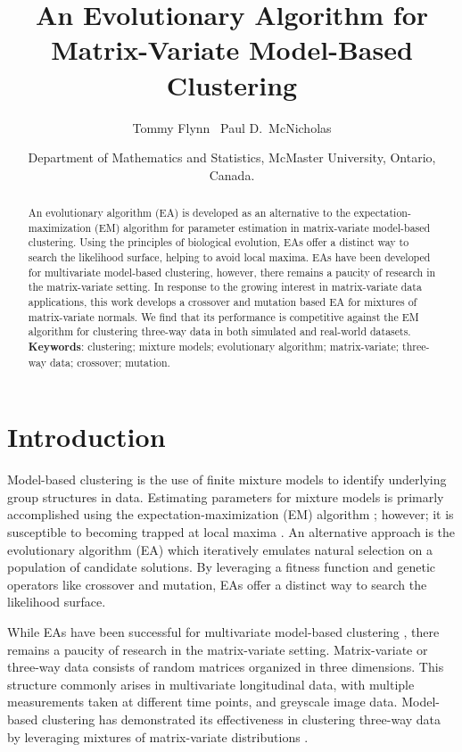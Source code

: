 \documentclass[12pt, centerh1]{article}
\title{An Evolutionary Algorithm for Matrix-Variate Model-Based Clustering}
\author{\qquad Tommy Flynn \qquad\qquad\ Paul D.\ McNicholas}
\date{{\small Department of Mathematics and Statistics, McMaster University, Ontario, Canada.}}
\begin{document}
\maketitle

\begin{abstract}
An evolutionary algorithm (EA) is developed as an alternative to the expectation-maximization (EM) algorithm for parameter estimation in matrix-variate model-based clustering. Using the principles of biological evolution, EAs offer a distinct way to search the likelihood surface, helping to avoid local maxima. EAs have been developed for multivariate model-based clustering, however, there remains a paucity of research in the matrix-variate setting. In response to the growing interest in matrix-variate data applications, this work develops a crossover and mutation based EA for mixtures of matrix-variate normals. We find that its performance is competitive against the EM algorithm for clustering three-way data in both simulated and real-world datasets. \\[-10pt]

\noindent\textbf{Keywords}: clustering; mixture models; evolutionary algorithm; matrix-variate; three-way data; crossover; mutation.
\end{abstract}
\newpage


\section{Introduction}
Model-based clustering is the use of finite mixture models to identify underlying group structures in data. Estimating parameters for mixture models is primarly accomplished using the expectation-maximization (EM) algorithm \citep{dempster1977}; however; it is susceptible to becoming trapped at local maxima \citep{titterington1985}. An alternative approach is the evolutionary algorithm (EA) which iteratively emulates natural selection on a population of candidate solutions. By leveraging a fitness function and genetic operators like crossover and mutation, EAs offer a distinct way to search the likelihood surface.

While EAs have been successful for multivariate model-based clustering \citep{andrews2013,mcnicholas2020}, there remains a paucity of research in the matrix-variate setting. Matrix-variate or three-way data consists of random matrices organized in three dimensions. This structure commonly arises in multivariate longitudinal data, with multiple measurements taken at different time points, and greyscale image data. Model-based clustering has demonstrated its effectiveness in clustering three-way data by leveraging mixtures of matrix-variate distributions \citep{viroli2011, anderlucci2015, dogru2016, gallaugher2018, silva2023}.
\end{document}
